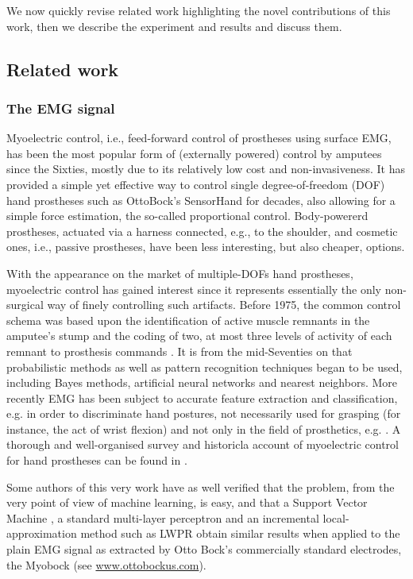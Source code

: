 We now quickly revise related work highlighting the novel contributions of this
work, then we describe the experiment and results and discuss them.

\subsection{Related work}

\subsubsection{The EMG signal}

Myoelectric control, i.e., feed-forward control of prostheses using surface EMG,
has been the most popular form of (externally powered) control by amputees since
the Sixties, mostly due to its relatively low cost and non-invasiveness. It has
provided a simple yet effective way to control single degree-of-freedom (DOF) hand
prostheses such as OttoBock's SensorHand for decades, also allowing for a simple
force estimation, the so-called proportional control. Body-powererd prostheses,
actuated via a harness connected, e.g., to the shoulder, and cosmetic ones, i.e.,
passive prostheses, have been less interesting, but also cheaper, options.

With the appearance on the market of multiple-DOFs hand prostheses, myoelectric
control has gained interest since it represents essentially the only non-surgical
way of finely controlling such artifacts. Before 1975, the common
control schema was based upon the identification of active muscle remnants in the
amputee's stump and the coding of two, at most three levels of activity of each
remnant to prosthesis commands \cite{bottomley65,childress69}. It is from the mid-Seventies
on that probabilistic methods as well as pattern recognition techniques began to be used,
including Bayes methods, artificial neural networks and nearest neighbors. More recently
EMG has been subject to accurate feature extraction and classification,
e.g. \cite{englehart01,dunlop,smagt06} in order to discriminate hand postures, not necessarily
used for grasping (for instance, the act of wrist flexion) and not only in the field
of prosthetics, e.g. \cite{fukuda,yokoi}. A thorough and well-organised survey and
historicla account of myoelectric control for hand prostheses can be found in
\cite{englehart06}.

Some authors of this very work \cite{2008.ICRA,2008.BioCyb} have as well verified that the problem, from
the very point of view of machine learning, is easy, and that a Support Vector Machine
\cite{BGV92}, a standard multi-layer perceptron and an incremental local-approximation
method such as LWPR \cite{lwpr} obtain similar results when applied to the plain EMG
signal as extracted by Otto Bock's commercially standard electrodes, the Myobock
(see \url{www.ottobockus.com}).

